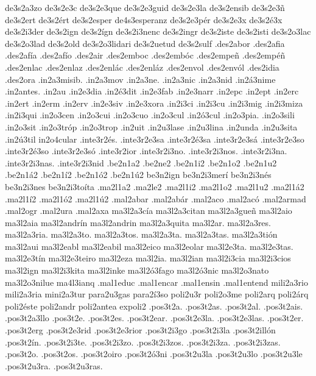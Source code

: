{de3s2a3zo
de3s2e3c
de3s2e3que
de3s2e3guid
de3s2e3la
de3s2ensib
de3s2e3ñ
de3s2ert
de3s2ért
de3s2esper de4s3esperanz
de3s2e3pér
de3s2e3x
de3s2é3x
de3s2i3der
de3s2ign
de3s2ígn
de3s2i3nenc
de3s2ingr
de3s2iste
de3s2isti
de3s2o3lac
de3s2o3lad
de3s2old
de3s2o3lidari
de3s2uetud
de3s2sulf
%
.des2abor
.des2afia
.des2afía
.des2afío
.des2air
.des2emboc
.des2embóc
.des2empeñ
.des2empéñ
.des2enlac
.des2enlaz
.des2enlác
.des2enláz
.des2envol
.des2envól
.des2idia
.des2ora
%
%
.in2a3misib.
.in2a3mov
.in2a3ne.
.in2a3nic
.in2a3nid
.in2á3nime
.in2antes.
.in2au
.in2e3dia
.in2é3dit
.in2e3fab
.in2e3narr
.in2epc
.in2ept
.in2erc
.in2ert
.in2erm
.in2erv
.in2e3siv
.in2e3xora
.in2i3ci
.in2i3cu
.in2i3mig
.in2i3miza
.in2i3qui
.in2o3cen
.in2o3cui
.in2o3cuo
.in2o3cul
.in2ó3cul
.in2o3pia.
.in2o3sili
.in2o3sit
.in2o3tróp
.in2o3trop
.in2uit
.in2u3lase
.in2u3lina
.in2unda
.in2u3sita
.in2ú3til
in2o4cular
%
%
.inte3r2és. .inte3r2e3sa .inte3r2é3sa .inte3r2e3sá .inte3r2e3so .inte3r2é3so .inte3r2e3só .inte3r2ior .inte3r2i3no. .inte3r2i3nos. .inte3r2i3na. .inte3r2i3nas. .inte3r2i3nid
%
.be2n1a2 .be2ne2 .be2n1i2 .be2n1o2 .be2n1u2 .be2n1á2        .be2n1í2 .be2n1ó2 .be2n1ú2
%
be3n2ign
be3n2i3merí
be3n2i3nés
be3n2i3nes
be3n2i3toíta
%
.ma2l1a2 .ma2le2 .ma2l1i2 .ma2l1o2 .ma2l1u2 .ma2l1á2        .ma2l1í2 .ma2l1ó2 .ma2l1ú2
%
.mal2abar
.mal2abár
.mal2aco
.mal2acó
.mal2armad
.mal2ogr
.mal2ura
.mal2axa
%
ma3l2a3cía
ma3l2a3citan
ma3l2a3gueñ
ma3l2aio
ma3l2aia
ma3l2andrín
ma3l2andrin
ma3l2a3quita
ma3l2ar.
ma3l2a3res.
ma3l2a3ria.
ma3l2a3to.
ma3l2a3tos.
ma3l2a3ta.
ma3l2a3tas.
ma3l2a3tión
ma3l2aui
ma3l2eabl
ma3l2eabil
ma3l2eico
ma3l2eolar
ma3l2e3ta.
ma3l2e3tas.
ma3l2e3tín
ma3l2e3teiro
ma3l2eza
ma3l2ia.
ma3l2ian
ma3l2i3cia
ma3l2i3cios
ma3l2ign
ma3l2i3kita
ma3l2inke
ma3l2ó3fago
ma3l2ó3nic
ma3l2o3nato
ma3l2o3nilue
ma4l3ianq
%
.mal1educ
.mal1encar
.mal1ensin
.mal1entend
%
%
mili2a3rio mili2a3ria
mini2a3tur
%
para2u3gas para2í3so
%
%
poli2u3r
poli2o3me
poli2arq
poli2árq
poli2éste
poli2andr
poli2antea
expoli2
%
.pos3t2a.
.pos3t2as.
.pos3t2al.
.pos3t2ais.
.pos3t2a3llo
.pos3t2e.
.pos3t2es.
.pos3t2ear.
.pos3t2e3la.
.pos3t2e3las.
.pos3t2er.
.pos3t2erg
.pos3t2e3rid
.pos3t2e3rior
.pos3t2i3go
.pos3t2i3la
.pos3t2illón
.pos3t2ín.
.pos3t2i3te.
.pos3t2i3zo.
.pos3t2i3zos.
.pos3t2i3za.
.pos3t2i3zas.
.pos3t2o.
.pos3t2os.
.pos3t2oiro
.pos3t2ó3ni
.pos3t2u3la
.pos3t2u3lo
.pos3t2u3le
.pos3t2u3ra.
.pos3t2u3ras.
%
}
